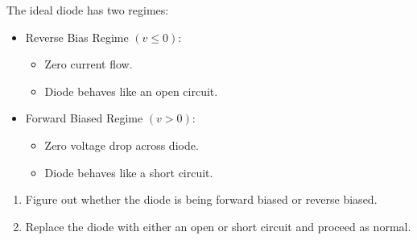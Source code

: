 \documentclass{article}
\begin{document}


 The ideal diode has two regimes:
\begin{itemize}
\item Reverse Bias Regime $(v \leq 0)$:
  \begin{itemize}
  \item Zero current flow.
  \item Diode behaves like an open circuit.
  \end{itemize}
\item Forward Biased Regime $(v > 0)$:
  \begin{itemize}
  \item Zero voltage drop across diode.
  \item Diode behaves like a short circuit.
  \end{itemize}
\end{itemize}
\begin{enumerate}
\item Figure out whether the diode is being forward biased or reverse biased.
\item Replace the diode with either an open or short circuit and proceed as normal.
\end{enumerate}
\end{document}
